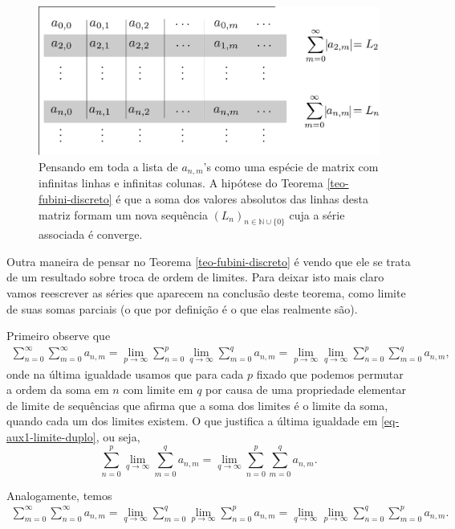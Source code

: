 \begin{figure}[H]
\centering
\includegraphics[width=0.75\linewidth]{Figuras/fubini-anm}
\caption{Pensando em toda a lista de $a_{n,m}$'s como uma espécie de matrix com infinitas linhas e infinitas colunas. A hipótese do Teorema \ref{teo-fubini-discreto} é que a soma dos valores absolutos das linhas desta matriz formam um nova sequência $(L_n)_{n\in\mathbb{N}\cup\{0\}}$ cuja a série associada é converge.}
\label{fig:fubini-anm}
\end{figure}


Outra maneira de pensar no Teorema \ref{teo-fubini-discreto} é vendo
que ele se trata de um resultado sobre troca de ordem de limites.
Para deixar isto mais claro vamos reescrever as séries
que aparecem na conclusão deste teorema, como limite de suas somas parciais 
(o que por definição é o que elas realmente são). 


Primeiro observe que
\begin{align}\label{eq-aux1-limite-duplo}
\sum_{n=0}^{\infty}\sum_{m=0}^{\infty}a_{n,m}
=
\lim_{p\to\infty}\sum_{n=0}^{p}\lim_{q\to\infty} \sum_{m=0}^{q}a_{n,m} 
=
\lim_{p\to\infty} \lim_{q\to\infty} \sum_{n=0}^{p} \sum_{m=0}^{q}a_{n,m}, 
\end{align}
onde na última igualdade usamos que para cada $p$ fixado que podemos
permutar a ordem da soma em $n$ com limite em $q$ por causa de uma propriedade
elementar de limite de sequências que afirma que a soma 
dos limites é o limite da soma,
quando cada um dos limites existem. O que justifica a última 
igualdade em \eqref{eq-aux1-limite-duplo}, ou seja,
\[
\sum_{n=0}^{p}\lim_{q\to\infty} \sum_{m=0}^{q}a_{n,m} 
=
\lim_{q\to\infty} \sum_{n=0}^{p}\sum_{m=0}^{q}a_{n,m}. 
\]
\bigskip 


Analogamente, temos 
\begin{align}\label{eq-aux2-limite-duplo}
\sum_{m=0}^{\infty}\sum_{n=0}^{\infty}a_{n,m}
=
\lim_{q\to\infty}\sum_{m=0}^{q}
\lim_{p\to\infty} \sum_{n=0}^{p}
a_{n,m} 
=
\lim_{q\to\infty} 
\lim_{p\to\infty} 
\sum_{n=0}^{q} 
\sum_{m=0}^{p}
a_{n,m}. 
\end{align}

